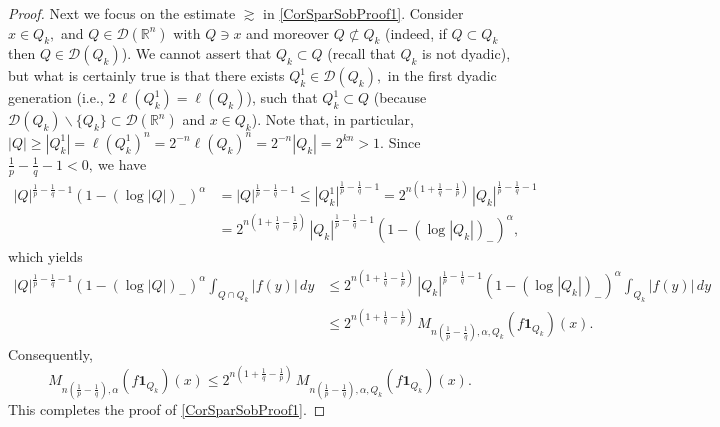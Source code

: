 \documentclass[11pt, a4paper,leqno]{amsart}
\theoremstyle{plain}
\numberwithin{equation}{section}
\theoremstyle{definition}
\theoremstyle{remark}
\begin{document}
\begin{proof}
Next we focus on the estimate $\gtrsim$ in \eqref{CorSparSobProof1}. Consider
$x\in Q_{k},$ and $Q\in\mathcal{D}(\mathbb{R}^{n})$ with $Q\ni x$ and moreover
$Q\not \subset Q_{k}$ (indeed, if $Q\subset Q_{k}$ then $Q\in\mathcal{D}%
(Q_{k})$). We cannot assert that $Q_{k}\subset Q$ (recall that $Q_{k}$ is not
dyadic), but what is certainly true is that there exists $Q_{k}^{1}%
\in\mathcal{D}(Q_{k}),$ in the first dyadic generation (i.e., $2\,\ell
(Q_{k}^{1})=\ell(Q_{k})$), such that $Q_{k}^{1}\subset Q$ (because
$\mathcal{D}(Q_{k})\backslash\{Q_{k}\}\subset\mathcal{D}(\mathbb{R}^{n})$ and
$x\in Q_{k}$). Note that, in particular, $|Q|\geq|Q_{k}^{1}|=\ell(Q_{k}%
^{1})^{n}=2^{-n}\ell(Q_{k})^{n}=2^{-n}|Q_{k}|=2^{kn}>1$. Since $\frac{1}%
{p}-\frac{1}{q}-1<0,\ $we have
\begin{align*}
|Q|^{\frac{1}{p}-\frac{1}{q}-1}(1-(\log|Q|)_{-})^{\alpha}  &  =|Q|^{\frac
{1}{p}-\frac{1}{q}-1}\leq|Q_{k}^{1}|^{\frac{1}{p}-\frac{1}{q}-1}%
=2^{n(1+\frac{1}{q}-\frac{1}{p})}\,|Q_{k}|^{\frac{1}{p}-\frac{1}{q}-1}\\
&  =2^{n(1+\frac{1}{q}-\frac{1}{p})}\,|Q_{k}|^{\frac{1}{p}-\frac{1}{q}%
-1}(1-(\log|Q_{k}|)_{-})^{\alpha},
\end{align*}
which yields
\begin{align*}
|Q|^{\frac{1}{p}-\frac{1}{q}-1}(1-(\log|Q|)_{-})^{\alpha}\int_{Q\cap Q_{k}%
}|f(y)|\,dy  &  \leq 2^{n(1+\frac{1}{q}-\frac{1}{p})}\,|Q_{k}|^{\frac{1}{p}%
-\frac{1}{q}-1}(1-(\log|Q_{k}|)_{-})^{\alpha}\int_{Q_{k}}|f(y)|\,dy\\
&  \leq2^{n(1+\frac{1}{q}-\frac{1}{p})}\,M_{n(\frac{1}{p}%
-\frac{1}{q}),\alpha,Q_{k}}(f\mathbf{1}_{Q_{k}})(x).
\end{align*}
Consequently,
\[
M_{n(\frac{1}{p}-\frac{1}{q}),\alpha}(f\mathbf{1}_{Q_{k}})(x)\leq
2^{n(1+\frac{1}{q}-\frac{1}{p})}\,M_{n(\frac{1}{p}-\frac{1}{q}),\alpha,Q_{k}%
}(f\mathbf{1}_{Q_{k}})(x).
\]
This completes the proof of \eqref{CorSparSobProof1}.


\end{proof}
\end{document}
